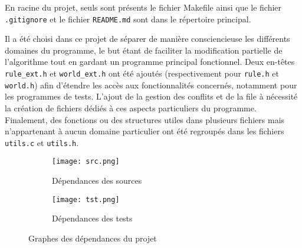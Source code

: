 En racine du projet, seuls sont présents le fichier Makefile ainsi que le fichier \texttt{.gitignore} et le fichier \texttt{README.md} sont dans le répertoire principal.

Il a été choisi dans ce projet de séparer de manière consciencieuse les différents domaines du programme, le but étant de faciliter la modification partielle de l'algorithme tout en gardant un programme principal fonctionnel. Deux en-têtes \texttt{rule\_ext.h} et \texttt{world\_ext.h} ont été ajoutés (respectivement pour \texttt{rule.h} et \texttt{world.h}) afin d'étendre les accès aux fonctionnalités concernés, notamment pour les programmes de tests. L'ajout de la gestion des conflits et de la file à nécessité la création de fichiers dédiés à ces aspects particuliers du programme. Finalement, des fonctions ou des structures utiles dans plusieurs fichiers mais n'appartenant à aucun domaine particulier ont été regroupés dans les fichiers \texttt{utils.c} et \texttt{utils.h}. 
\medskip


\begin{figure}[h!]
    \centering
    \begin{subfigure}{0.8\textwidth}
        \centering
        \texttt{[image: src.png]}
        \caption{Dépendances des sources}
        \label{fig:GrapheDepSource}
    \end{subfigure}
    
    \bigskip
    
    \begin{subfigure}{0.8\textwidth}
        \centering
        \texttt{[image: tst.png]}
        \caption{Dépendances des tests}
        \label{fig:GrapheDepTests}
    \end{subfigure}
    \caption{Graphes des dépendances du projet}
    \label{fig:GrapheDep}
\end{figure}